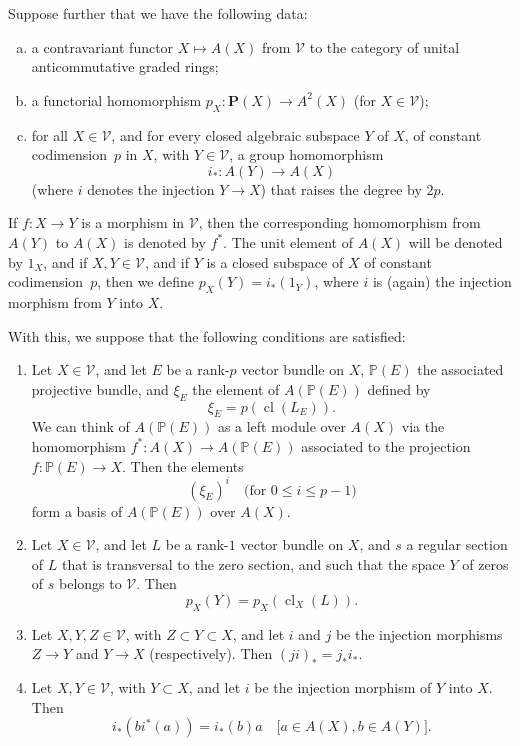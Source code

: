 \documentclass{article}
\renewcommand{\cal}[1]{{\mathcal{#1}}}
\newcommand{\PP}{\mathbf{P}}
\renewcommand{\leq}{\leqslant}
\DeclareMathOperator{\cl}{cl}
\newcommand{\oldpage}[1]{\marginpar{\footnotesize$\Big\vert$ \textit{p.~#1}}}
\begin{document}
Suppose further that we have the following data:
\begin{enumerate}[a.]
  \item\label{dataa}
    a contravariant functor $X\mapsto A(X)$ from $\cal{V}$ to the category of unital anticommutative graded rings;
  \item\label{datab}
    a functorial homomorphism $p_X\colon\PP(X)\to A^2(X)$ (for $X\in\cal{V}$);
  \item\label{datac}
    for all $X\in\cal{V}$, and for every closed algebraic subspace $Y$ of $X$, of constant codimension~$p$ in $X$, with $Y\in\cal{V}$, a group homomorphism
    \[
      i_*\colon A(Y)\to A(X)
    \]
    (where $i$ denotes the injection $Y\to X$) that raises the degree by $2p$.
\end{enumerate}

If $f\colon X\to Y$ is a morphism in $\cal{V}$, then the corresponding homomorphism from $A(Y)$ to $A(X)$ is denoted by $f^*$.
The unit element of $A(X)$ will be denoted by $1_X$, and if $X,Y\in\cal{V}$, and if $Y$ is a closed subspace of $X$ of constant codimension~$p$, then we define $p_X(Y)=i_*(1_Y)$, where $i$ is (again) the injection morphism from $Y$ into $X$.

With this, we suppose that the following conditions are satisfied:
\begin{enumerate}[({A}1)]
  \item\label{axiomA1}
    Let $X\in\cal{V}$, and let $E$ be a rank-$p$ vector bundle on $X$, $\mathbb{P}(E)$ the associated projective bundle, and $\xi_E$ the element of $A(\mathbb{P}(E))$ defined by
    \[
      \xi_E = p(\cl(L_E)).
    \]
    We can think of $A(\mathbb{P}(E))$ as a left module over $A(X)$ via the homomorphism $f^*\colon A(X)\to A(\mathbb{P}(E))$ associated to the projection $f\colon\mathbb{P}(E)\to X$.
    Then the elements
    \[
      (\xi_E)^i
      \quad\mbox{(for $0\leq i\leq p-1$)}
    \]
    form a basis of $A(\mathbb{P}(E))$ over $A(X)$.
  \item\label{axiomA2}
    Let $X\in\cal{V}$, and let $L$ be a rank-$1$ vector bundle on $X$, and $s$ a regular section of $L$ that is transversal to the zero section, and such that the space $Y$ of zeros of $s$ belongs to $\cal{V}$.
    Then
    \[
      p_X(Y) = p_X(\cl_X(L)).
    \]
  \item\label{axiomA3}
    Let $X,Y,Z\in\cal{V}$, with $Z\subset Y\subset X$, and let $i$ and $j$ be the injection morphisms $Z\to Y$ and $Y\to X$ (respectively).
    Then $(ji)_* = j_*i_*$.
  \item\label{axiomA4}
    Let $X,Y\in\cal{V}$, with $Y\subset X$, and let $i$ be the injection morphism of $Y$
\oldpage{141}
  into $X$.
    Then
    \[
      i_*(bi^*(a)) = i_*(b)a
      \quad\mbox{[$a\in A(X),b\in A(Y)$].}
    \]
\end{enumerate}
\end{document}
